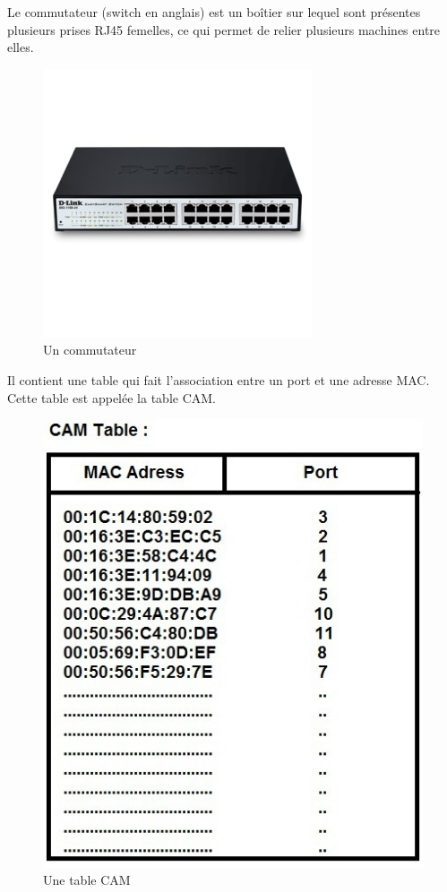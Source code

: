 \documentclass{beamer}
\begin{document}
\begin{frame}[allowframebreaks]
    Le commutateur (switch en anglais) est un boîtier sur lequel sont présentes plusieurs prises RJ45 femelles, ce qui permet de relier plusieurs machines entre elles.
    \begin{figure}[h]
        \includegraphics[scale=0.4]{2-Commutateur}
        \caption{Un commutateur}
    \end{figure}
    Il contient une table qui fait l'association entre un port et une adresse MAC. Cette table est appelée la table CAM.
    \begin{figure}[h]
        \includegraphics[scale=0.35]{2-Table_CAM}
        \caption{Une table CAM}
    \end{figure}
    
\end{frame}
\end{document}
